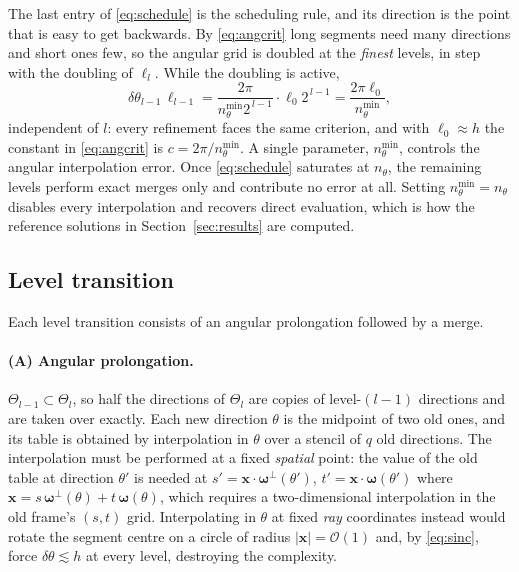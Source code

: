 \documentclass[11pt]{article}
\newcommand{\bx}{\mathbf{x}}
\newcommand{\om}{\boldsymbol{\omega}}
\newcommand{\omp}{\om^{\perp}}
\newcommand{\bigO}{\mathcal{O}}
\begin{document}
The last entry of \eqref{eq:schedule} is the scheduling rule, and its direction
is the point that is easy to get backwards. By \eqref{eq:angcrit} long segments
need many directions and short ones few, so the angular grid is doubled at the
\emph{finest} levels, in step with the doubling of $\ell_l$. While the
doubling is active,
\begin{equation}
  \delta\theta_{l-1}\,\ell_{l-1}
  = \frac{2\pi}{n_\theta^{\min}2^{\,l-1}}\cdot \ell_0 2^{\,l-1}
  = \frac{2\pi\ell_0}{n_\theta^{\min}} ,
  \label{eq:constant}
\end{equation}
independent of $l$: every refinement faces the same criterion, and with
$\ell_0\approx h$ the constant in \eqref{eq:angcrit} is
$c=2\pi/n_\theta^{\min}$. A single parameter, $n_\theta^{\min}$, controls the
angular interpolation error. Once \eqref{eq:schedule} saturates at $n_\theta$,
the remaining levels perform exact merges only and contribute no error at all.
Setting $n_\theta^{\min}=n_\theta$ disables every interpolation and recovers
direct evaluation, which is how the reference solutions in
Section~\ref{sec:results} are computed.

\subsection{Level transition}

Each level transition consists of an angular prolongation followed by a merge.

\paragraph{(A) Angular prolongation.}
$\Theta_{l-1}\subset\Theta_l$, so half the directions of $\Theta_l$ are copies
of level-$(l-1)$ directions and are taken over exactly. Each new direction
$\theta$ is the midpoint of two old ones, and its table is obtained by
interpolation in $\theta$ over a stencil of $q$ old directions. The
interpolation must be performed at a fixed \emph{spatial} point: the value of
the old table at direction $\theta'$ is needed at
$s'=\bx\cdot\omp(\theta')$, $t'=\bx\cdot\om(\theta')$ where
$\bx=s\,\omp(\theta)+t\,\om(\theta)$, which requires a two-dimensional
interpolation in the old frame's $(s,t)$ grid. Interpolating in $\theta$ at
fixed \emph{ray} coordinates instead would rotate the segment centre on a
circle of radius $|\bx|=\bigO(1)$ and, by \eqref{eq:sinc}, force
$\delta\theta\lesssim h$ at every level, destroying the complexity.
\end{document}

